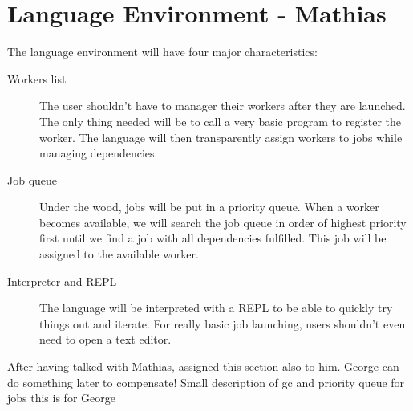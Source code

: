 \section{Language Environment - Mathias}
\label{sect:tech}
The language environment will have four major characteristics:
\begin{description}
\item[Workers list] The user shouldn't have to manager their workers after
they are launched. The only thing needed will be to call a very basic program
to register the worker. The language will then transparently assign workers
to jobs while managing dependencies.
\item[Job queue] Under the wood, jobs will be put in a priority queue. When a
worker becomes available, we will search the job queue in order of highest
priority first until we find a job with all dependencies fulfilled. This job
will be assigned to the available worker.
\item[Interpreter and REPL] The language will be interpreted with a REPL to be able to
quickly try things out and iterate. For really basic job launching, users shouldn't
even need to open a text editor.
\end{description}


After having talked with Mathias, assigned this section also to him.
George can do something later to compensate!
Small description of gc and priority queue for jobs
this is for George
